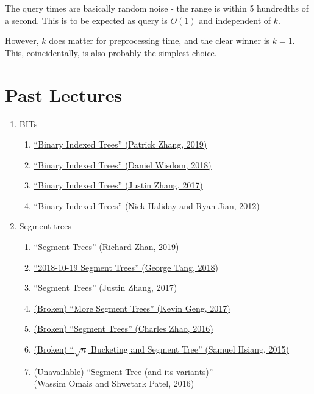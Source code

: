 \documentclass[11pt, oneside]{article}
\begin{document}
The query times are basically random noise - the range is within 5 hundredths of a second.
This is to be expected as query is \( O(1) \) and independent of \( k \).

However, \( k \) does matter for preprocessing time, and the clear winner is \( k = 1 \).
This, coincidentally, is also probably the simplest choice.

\newpage

\section{Past Lectures}

\begin{enumerate}
  \item BITs
    \begin{enumerate}
      \item \href{https://activities.tjhsst.edu/sct/lectures/1920/2019_11_01_Binary_Index_Trees.pdf}{``Binary Indexed Trees'' (Patrick Zhang, 2019)}
      \item \href{https://activities.tjhsst.edu/sct/lectures/1819/2018_11_30_Binary_Indexed_Trees.pdf}{``Binary Indexed Trees'' (Daniel Wisdom, 2018)}
      \item \href{https://activities.tjhsst.edu/sct/lectures/1718/2017-11-10_Binary_Indexed_Trees.pdf}{``Binary Indexed Trees'' (Justin Zhang, 2017)}
      \item \href{https://activities.tjhsst.edu/sct/lectures/1213/bit_09_28_12.pdf}{``Binary Indexed Trees'' (Nick Haliday and Ryan Jian, 2012)}
    \end{enumerate}

  \item Segment trees
    \begin{enumerate}
      \item \href{https://activities.tjhsst.edu/sct/lectures/1920/2019_11_15_Segment_Trees.pdf}{``Segment Trees'' (Richard Zhan, 2019)}
      \item \href{https://activities.tjhsst.edu/sct/lectures/1819/2018_10_19_Segment_Trees.pdf}{``2018-10-19 Segment Trees'' (George Tang, 2018)}
      \item \href{https://activities.tjhsst.edu/sct/lectures/1718/2017-12-08_Segment_Trees.pdf}{``Segment Trees'' (Justin Zhang, 2017)}
      \item \href{https://activities.tjhsst.edu/sct/lectures/1617/2017-01-13_More_Segment_Trees.pdf}{(Broken) ``More Segment Trees'' (Kevin Geng, 2017)}
      \item \href{https://activities.tjhsst.edu/sct/lectures/1617/2016-10-28_Segment_Trees.pdf}{(Broken) ``Segment Trees'' (Charles Zhao, 2016)}
      \item \href{https://activities.tjhsst.edu/sct/lectures/1516/SCT_Segment_Tree.pdf}{(Broken) ``\( \sqrt{n} \) Bucketing and Segment Tree'' (Samuel Hsiang, 2015)}
      \item (Unavailable) ``Segment Tree (and its variants)'' \\ (Wassim Omais and Shwetark Patel, 2016)
    \end{enumerate}


\end{enumerate}
\end{document}
